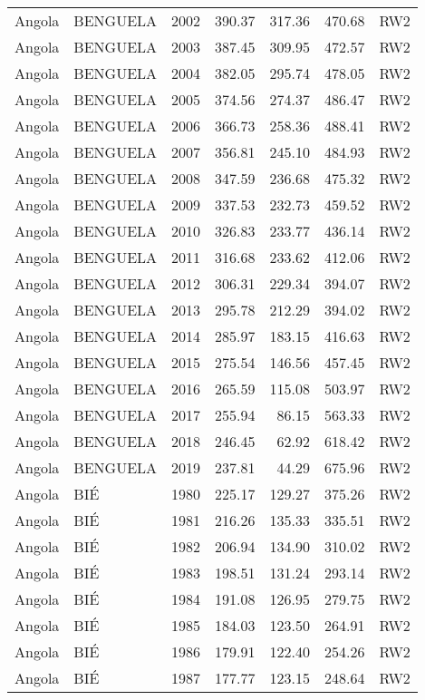 \begin{longtable}{lllrrrl}
  Angola & BENGUELA & 2002 & 390.37 & 317.36 & 470.68 & RW2 \\ 
  Angola & BENGUELA & 2003 & 387.45 & 309.95 & 472.57 & RW2 \\ 
  Angola & BENGUELA & 2004 & 382.05 & 295.74 & 478.05 & RW2 \\ 
  Angola & BENGUELA & 2005 & 374.56 & 274.37 & 486.47 & RW2 \\ 
  Angola & BENGUELA & 2006 & 366.73 & 258.36 & 488.41 & RW2 \\ 
  Angola & BENGUELA & 2007 & 356.81 & 245.10 & 484.93 & RW2 \\ 
  Angola & BENGUELA & 2008 & 347.59 & 236.68 & 475.32 & RW2 \\ 
  Angola & BENGUELA & 2009 & 337.53 & 232.73 & 459.52 & RW2 \\ 
  Angola & BENGUELA & 2010 & 326.83 & 233.77 & 436.14 & RW2 \\ 
  Angola & BENGUELA & 2011 & 316.68 & 233.62 & 412.06 & RW2 \\ 
  Angola & BENGUELA & 2012 & 306.31 & 229.34 & 394.07 & RW2 \\ 
  Angola & BENGUELA & 2013 & 295.78 & 212.29 & 394.02 & RW2 \\ 
  Angola & BENGUELA & 2014 & 285.97 & 183.15 & 416.63 & RW2 \\ 
  Angola & BENGUELA & 2015 & 275.54 & 146.56 & 457.45 & RW2 \\ 
  Angola & BENGUELA & 2016 & 265.59 & 115.08 & 503.97 & RW2 \\ 
  Angola & BENGUELA & 2017 & 255.94 & 86.15 & 563.33 & RW2 \\ 
  Angola & BENGUELA & 2018 & 246.45 & 62.92 & 618.42 & RW2 \\ 
  Angola & BENGUELA & 2019 & 237.81 & 44.29 & 675.96 & RW2 \\ 
  Angola & BIÉ & 1980 & 225.17 & 129.27 & 375.26 & RW2 \\ 
  Angola & BIÉ & 1981 & 216.26 & 135.33 & 335.51 & RW2 \\ 
  Angola & BIÉ & 1982 & 206.94 & 134.90 & 310.02 & RW2 \\ 
  Angola & BIÉ & 1983 & 198.51 & 131.24 & 293.14 & RW2 \\ 
  Angola & BIÉ & 1984 & 191.08 & 126.95 & 279.75 & RW2 \\ 
  Angola & BIÉ & 1985 & 184.03 & 123.50 & 264.91 & RW2 \\ 
  Angola & BIÉ & 1986 & 179.91 & 122.40 & 254.26 & RW2 \\ 
  Angola & BIÉ & 1987 & 177.77 & 123.15 & 248.64 & RW2 \\ 

\end{longtable}
